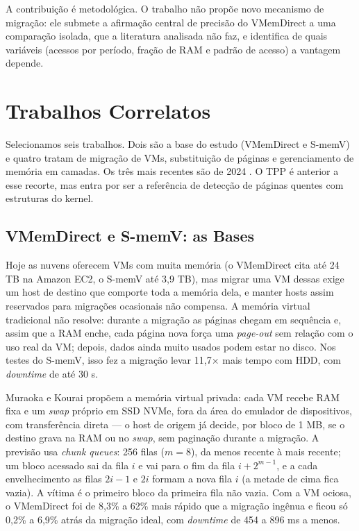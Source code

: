 \documentclass[12pt]{article}
\begin{document}
A contribuição é metodológica. O trabalho não propõe novo mecanismo de migração: ele submete a afirmação central de precisão do VMemDirect a uma comparação isolada, que a literatura analisada não faz, e identifica de quais variáveis (acessos por período, fração de RAM e padrão de acesso) a vantagem depende.

\section{Trabalhos Correlatos}

Selecionamos seis trabalhos. Dois são a base do estudo (VMemDirect e S-memV) e quatro tratam de migração de VMs, substituição de páginas e gerenciamento de memória em camadas. Os três mais recentes são de 2024 \cite{wu2024characterizing,negy2024ballooning,zhong2024managing}. O TPP \cite{maruf2023tpp} é anterior a esse recorte, mas entra por ser a referência de detecção de páginas quentes com estruturas do kernel.

\subsection{VMemDirect e S-memV: as Bases}

Hoje as nuvens oferecem VMs com muita memória (o VMemDirect cita até 24 TB na Amazon EC2, o S-memV até 3,9 TB), mas migrar uma VM dessas exige um host de destino que comporte toda a memória dela, e manter hosts assim reservados para migrações ocasionais não compensa. A memória virtual tradicional não resolve: durante a migração as páginas chegam em sequência e, assim que a RAM enche, cada página nova força uma \textit{page-out} sem relação com o uso real da VM; depois, dados ainda muito usados podem estar no disco. Nos testes do S-memV, isso fez a migração levar 11,7$\times$ mais tempo com HDD, com \textit{downtime} de até 30 s.

Muraoka e Kourai \cite{muraoka2023vmemdirect} propõem a memória virtual privada: cada VM recebe RAM fixa e um \textit{swap} próprio em SSD NVMe, fora da área do emulador de dispositivos, com transferência direta — o host de origem já decide, por bloco de 1 MB, se o destino grava na RAM ou no \textit{swap}, sem paginação durante a migração. A previsão usa \textit{chunk queues}: 256 filas ($m=8$), da menos recente à mais recente; um bloco acessado sai da fila $i$ e vai para o fim da fila $i+2^{m-1}$, e a cada envelhecimento as filas $2i-1$ e $2i$ formam a nova fila $i$ (a metade de cima fica vazia). A vítima é o primeiro bloco da primeira fila não vazia. Com a VM ociosa, o VMemDirect foi de 8,3\% a 62\% mais rápido que a migração ingênua e ficou só 0,2\% a 6,9\% atrás da migração ideal, com \textit{downtime} de 454 a 896 ms a menos.
\end{document}
